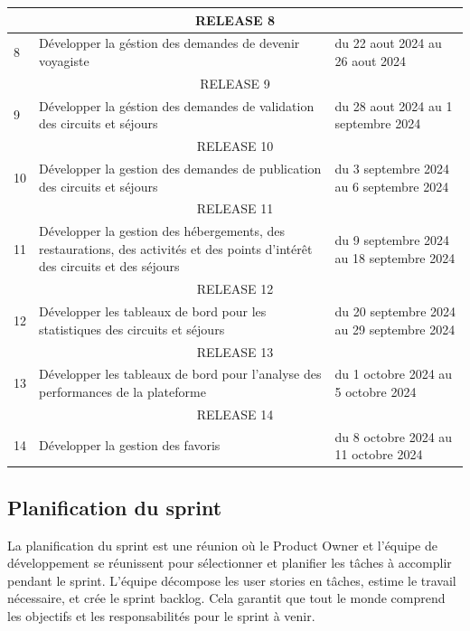 \documentclass[12pt]{report}
\begin{document}
\begin{longtable}{|p{1cm}|p{7cm}|p{6cm}|}
						\hline
						\multicolumn{3}{|c|}{RELEASE 8}\\
						\hline
						8 & Développer la géstion des demandes de devenir voyagiste & du 22 aout 2024 au 26 aout 2024\\
						\hline
						\multicolumn{3}{|c|}{RELEASE 9}\\
						\hline
						9 & Développer la géstion des demandes de validation des circuits et séjours &du 28 aout 2024 au 1 septembre 2024\\
						\hline
						\multicolumn{3}{|c|}{RELEASE 10}\\
						\hline
						10 & Développer la gestion des demandes de publication des circuits et séjours &du 3 septembre 2024 au 6 septembre 2024\\
						\hline
						\multicolumn{3}{|c|}{RELEASE 11}\\
						\hline
						11 &Développer la gestion des hébergements, des restaurations, des activités et des points d'intérêt des circuits et des séjours & du 9 septembre 2024 au 18 septembre 2024\\				
						\hline
						\multicolumn{3}{|c|}{RELEASE 12}\\
						\hline
						12 & Développer les tableaux de bord pour les statistiques des circuits et séjours& du 20 septembre 2024 au 29 septembre 2024\\
						\hline
						\multicolumn{3}{|c|}{RELEASE 13}\\
						\hline
						13 & Développer les tableaux de bord pour l'analyse des performances de la plateforme & du 1 octobre 2024 au 5 octobre 2024\\
						\hline
						\multicolumn{3}{|c|}{RELEASE 14}\\
						\hline
						14 & Développer la gestion des favoris & du 8 octobre 2024 au 11 octobre 2024\\
						\hline			
				    \end{longtable}

				\subsection{Planification du sprint}

				\hspace{15pt} La planification du sprint est une réunion où le Product Owner et l'équipe de développement se réunissent pour sélectionner et planifier les tâches à accomplir pendant le sprint. L'équipe décompose les user stories en tâches, estime le travail nécessaire, et crée le sprint backlog. Cela garantit que tout le monde comprend les objectifs et les responsabilités pour le sprint à venir.\\
\end{document}
